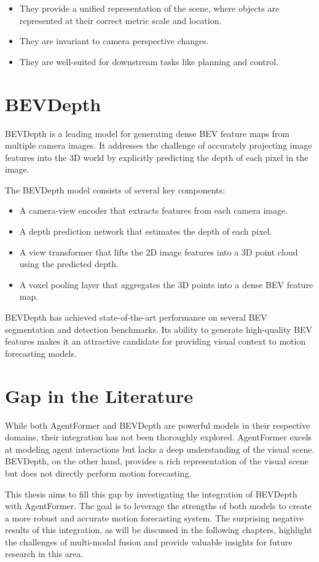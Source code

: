 \begin{itemize}
    \item They provide a unified representation of the scene, where objects are represented at their correct metric scale and location.
    \item They are invariant to camera perspective changes.
    \item They are well-suited for downstream tasks like planning and control.
\end{itemize}

\section{BEVDepth}

BEVDepth \citep{li2022bevdepth} is a leading model for generating dense BEV feature maps from multiple camera images. It addresses the challenge of accurately projecting image features into the 3D world by explicitly predicting the depth of each pixel in the image.

The BEVDepth model consists of several key components:

\begin{itemize}
    \item A camera-view encoder that extracts features from each camera image.
    \item A depth prediction network that estimates the depth of each pixel.
    \item A view transformer that lifts the 2D image features into a 3D point cloud using the predicted depth.
    \item A voxel pooling layer that aggregates the 3D points into a dense BEV feature map.
\end{itemize}

BEVDepth has achieved state-of-the-art performance on several BEV segmentation and detection benchmarks. Its ability to generate high-quality BEV features makes it an attractive candidate for providing visual context to motion forecasting models.

\section{Gap in the Literature}

While both AgentFormer and BEVDepth are powerful models in their respective domains, their integration has not been thoroughly explored. AgentFormer excels at modeling agent interactions but lacks a deep understanding of the visual scene. BEVDepth, on the other hand, provides a rich representation of the visual scene but does not directly perform motion forecasting.

This thesis aims to fill this gap by investigating the integration of BEVDepth with AgentFormer. The goal is to leverage the strengths of both models to create a more robust and accurate motion forecasting system. The surprising negative results of this integration, as will be discussed in the following chapters, highlight the challenges of multi-modal fusion and provide valuable insights for future research in this area.

